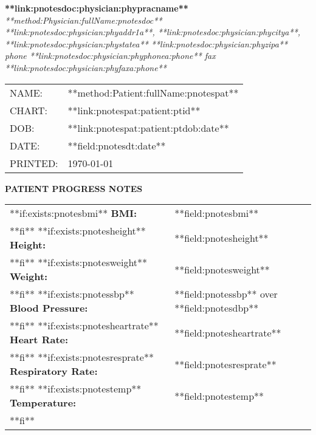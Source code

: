 \documentclass{article}
\newcommand{\sheading}[1]{\textbf{#1:}}
\begin{document}
\begin{center}
        {\textbf{**link:pnotesdoc:physician:phypracname**}} \\
        {\textsl{**method:Physician:fullName:pnotesdoc**}} \\
        \textsl{**link:pnotesdoc:physician:phyaddr1a**, **link:pnotesdoc:physician:phycitya**, **link:pnotesdoc:physician:phystatea** **link:pnotesdoc:physician:phyzipa** } \\
        \textsl{phone **link:pnotesdoc:physician:phyphonea:phone** fax **link:pnotesdoc:physician:phyfaxa:phone**}
\end{center}

\begin{tabular}{ll}
NAME:	&	**method:Patient:fullName:pnotespat**	\\
CHART:	&	**link:pnotespat:patient:ptid** 	\\
DOB:	&	**link:pnotespat:patient:ptdob:date**	\\
DATE:	&	**field:pnotesdt:date** \\
PRINTED: &	\today \\
\end{tabular}

\begin{center}
	{\textbf{PATIENT PROGRESS NOTES}}
\end{center}

\begin{tabular}{ll}
**if:exists:pnotesbmi**
\sheading{BMI} & **field:pnotesbmi** \\
**fi**
**if:exists:pnotesheight**
\sheading{Height} & **field:pnotesheight** \\
**fi**
**if:exists:pnotesweight**
\sheading{Weight} & **field:pnotesweight** \\
**fi**
**if:exists:pnotessbp**
\sheading{Blood Pressure} & **field:pnotessbp** over **field:pnotesdbp** \\
**fi**
**if:exists:pnotesheartrate**
\sheading{Heart Rate} & **field:pnotesheartrate** \\
**fi**
**if:exists:pnotesresprate**
\sheading{Respiratory Rate} & **field:pnotesresprate** \\
**fi**
**if:exists:pnotestemp**
\sheading{Temperature} & **field:pnotestemp** \\
**fi**
\  &  \  
\end{tabular} \\
\par
\end{document}
